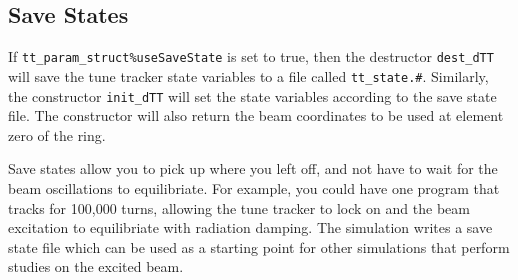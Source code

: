 \subsection{Save States}

If {\tt tt\_param\_struct\%useSaveState} is set to true, then the destructor {\tt dest\_dTT}
will save the tune tracker state variables to a file called {\tt tt\_state.\#}.
Similarly, the constructor {\tt init\_dTT} will set the state variables according to the 
save state file.  The constructor will also return the beam coordinates to be used
at element zero of the ring.

Save states allow you to pick up where you left off, and not have to wait for the
beam oscillations to equilibriate.  For example, you could have one program that tracks
for 100,000 turns, allowing the tune tracker to lock on and the beam excitation to equilibriate
with radiation damping.  The simulation writes a save state file which can be used as a starting
point for other simulations that perform studies on the excited beam.












